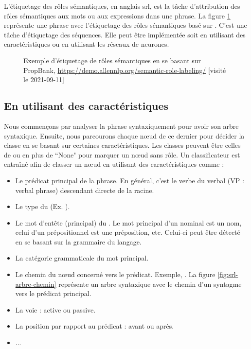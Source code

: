 \documentclass{KodeBook}
\begin{document}
L'étiquetage des rôles sémantiques, en anglais \ac{srl}, est la tâche d'attribution des rôles sémantiques aux mots ou aux expressions dans une phrase.
La figure \ref{fig:srl-exp} représente une phrase avec l'étiquetage des rôles sémantiques basé sur .
C'est une tâche d'étiquetage des séquences. 
Elle peut être implémentée soit en utilisant des caractéristiques ou en utilisant les réseaux de neurones.

\begin{figure}[ht]
	\centering
	\caption[Exemple d'étiquetage de rôles sémantiques en se basant sur PropBank]{Exemple d'étiquetage de rôles sémantiques en se basant sur PropBank, \url{https://demo.allennlp.org/semantic-role-labeling/} [visité le 2021-09-11]}
	\label{fig:srl-exp}
\end{figure}

\subsection{En utilisant des caractéristiques}

Nous commençons par analyser la phrase syntaxiquement pour avoir son arbre syntaxique. 
Ensuite, nous parcourons chaque nœud de ce dernier pour décider la classe en se basant sur certaines caractéristiques. 
Les classes peuvent être celles de  ou  en plus de ``None" pour marquer un nœud sans rôle.
Un classificateur est entraîné afin de classer un nœud en utilisant des caractéristiques comme :
\begin{itemize}
	\item Le prédicat principal de la phrase. En général, c'est le verbe du  verbal (VP : verbal phrase) descendant directe de la racine.
	\item Le type du  (Ex. ).
	\item Le mot d'entête (principal) du . 
	Le mot principal d'un  nominal est un nom, celui d'un  prépositionnel est une préposition, etc. 
	Celui-ci peut être détecté en se basant sur la grammaire du langage.
	\item La catégorie grammaticale du mot principal.
	\item Le chemin du nœud concerné vers le prédicat. 
	Exemple, .
	La figure \ref{fig:srl-arbre-chemin} représente un arbre syntaxique avec le chemin d'un syntagme vers le prédicat principal.
	\item La voie : active ou passive.
	\item La position par rapport au prédicat : avant ou après.
	\item ...
\end{itemize}
\end{document}
